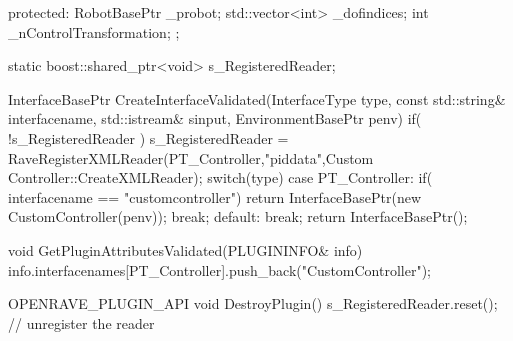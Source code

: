 \begin{DoxyCodeInclude}
{protected:
    RobotBasePtr _probot;
    std::vector<int> _dofindices;
    int _nControlTransformation;
};

static boost::shared_ptr<void> s_RegisteredReader;

InterfaceBasePtr CreateInterfaceValidated(InterfaceType type, const std::string& 
      interfacename, std::istream& sinput, EnvironmentBasePtr penv)
{
    if( !s_RegisteredReader ) {
        s_RegisteredReader = RaveRegisterXMLReader(PT_Controller,"piddata",Custom
      Controller::CreateXMLReader);
    }
    switch(type) {
    case PT_Controller:
        if( interfacename == "customcontroller")
            return InterfaceBasePtr(new CustomController(penv));
        break;
    default:
        break;
    }
    return InterfaceBasePtr();
}

void GetPluginAttributesValidated(PLUGININFO& info)
{
    info.interfacenames[PT_Controller].push_back("CustomController");
}

OPENRAVE_PLUGIN_API void DestroyPlugin()
{
    s_RegisteredReader.reset(); // unregister the reader
}
\end{DoxyCodeInclude}
 